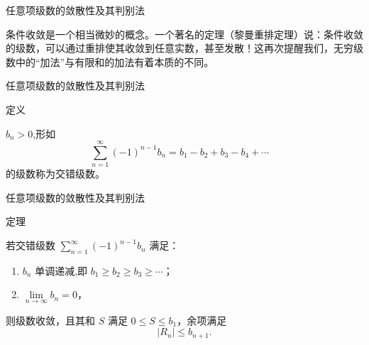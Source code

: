 \documentclass[aspectratio=169,10pt,fontset=fandol]{ctexbeamer}
\newenvironment{custom}[1]{\par\noindent\textbf{#1}\quad}{\par\vspace{0.8em}}
\begin{document}
\begin{frame}[t,fragile]{任意项级数的敛散性及其判别法}
\footnotesize
{\footnotesize
条件收敛是一个相当微妙的概念。一个著名的定理（黎曼重排定理）说：条件收敛的级数，可以通过重排使其收敛到任意实数，甚至发散！这再次提醒我们，无穷级数中的“加法”与有限和的加法有着本质的不同。

}
\end{frame}
\begin{frame}[t,fragile]{任意项级数的敛散性及其判别法}
\footnotesize
\begin{block}{定义}
{\footnotesize

$b_n > 0$,形如
\[
\sum_{n=1}^{\infty} (-1)^{n-1} b_n = b_1 - b_2 + b_3 - b_4 + \cdots \quad 
\]
的级数称为交错级数。

}
\end{block}
\end{frame}
\begin{frame}[t,fragile]{任意项级数的敛散性及其判别法}
\footnotesize
\begin{block}{定理}
{\footnotesize

若交错级数 \(\sum_{n=1}^{\infty} (-1)^{n-1} b_n\) 满足：
\begin{enumerate}
\item \(b_n\) 单调递减,即 \(b_1 \geq b_2 \geq b_3 \geq \cdots\)；
\item \(\lim\limits_{n\to\infty} b_n = 0\)，
\end{enumerate}
则级数收敛，且其和 \(S\) 满足 \(\boxed{0\leq S\leq b_1}\)，余项满足
\[
\boxed{|R_n|\le b_{n+1}}.
\]

}
\end{block}
\end{frame}
\end{document}
